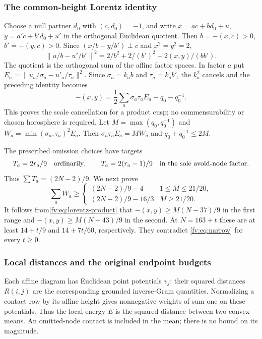 \documentclass[11pt]{article}
\theoremstyle{remark}\newtheorem{remark}[theorem]{Remark}
\numberwithin{equation}{section}
\begin{document}
\subsubsection{The common-height Lorentz identity}

Choose a null partner $d_0$ with $(c,d_0)=-1$, and write
 $x=a c+b d_0+u$, $y=a'c+b'd_0+u'$ in the orthogonal Euclidean
quotient. Then $b=-(x,c)>0$, $b'=-(y,c)>0$. Since
 $(x/b-y/b')\perp c$ and $x^2=y^2=2$,
\[
 \left\|u/b-u'/b'\right\|^2
   =2/b^2+2/(b')^2-2(x,y)/(bb').
\]
The quotient is the orthogonal sum of the affine factor spaces.
In factor $a$ put
 $E_a=\|u_a/\sigma_a-u'_a/\tau_a\|^2$.
Since $\sigma_a=k_ab$ and $\tau_a=k_ab'$, the $k_a^2$ cancels and
the preceding identity becomes
 \begin{equation}\label{fv:eq:lorentz-product}
 -(x,y)=\frac12\sum_a\sigma_a\tau_aE_a-q_0-q_0^{-1}.
\end{equation}
This proves the scale cancellation for a product cusp; no
commensurability or chosen horosphere is required.
Let $M=\max(q_0,q_0^{-1})$ and
 $W_a=\min(\sigma_a,\tau_a)^2E_a$. Then
 $\sigma_a\tau_aE_a=MW_a$ and $q_0+q_0^{-1}\le2M$.

The prescribed omission choices have targets
 \[
 T_a=2r_a/9\quad\hbox{ordinarily},\qquad
 T_a=2(r_a-1)/9\quad\hbox{in the sole avoid-node factor}.
\]
Thus $\sum T_a=(2N-2)/9$. We next prove
 \begin{equation}\label{fv:eq:two-range}
 \sum_aW_a\ge
 \begin{cases}(2N-2)/9-4&1\le M\le21/20,\\
 (2N-2)/9-16/3&M\ge21/20.
 \end{cases}
\end{equation}
It follows from\eqref{fv:eq:lorentz-product} that
 $-(x,y)\ge M(N-37)/9$ in the first range and
 $-(x,y)\ge M(N-43)/9$ in the second. At $N=163+t$ these are at
least $14+t/9$ and $14+7t/60$, respectively. They contradict
\eqref{fv:eq:narrow} for every $t\ge0$.


\subsubsection{Local distances and the original endpoint budgets}

Each affine diagram has Euclidean point potentials $v_j$:
their squared distances $R(i,j)$ are the corresponding grounded
inverse-Gram quantities. Normalizing a contact row by its affine
height gives nonnegative weights of sum one on these potentials.
Thus the local energy $E$ is the squared distance between two
convex means. An omitted-node contact is included in the mean;
there is no bound on its magnitude.
\end{document}
